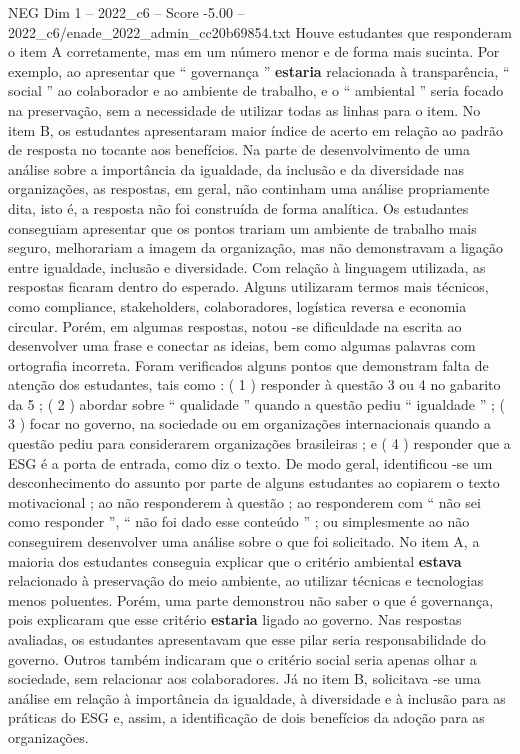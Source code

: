 \begin{textsample}{NEG Dim 1 – 2022\_c6 – Score -5.00 – 2022\_c6/enade\_2022\_admin\_cc20b69854.txt}
Houve estudantes que responderam o item A corretamente, mas em um número menor e de forma mais sucinta.
Por exemplo, ao apresentar que “ governança ” \textbf{estaria} relacionada à transparência, “ social ” ao colaborador e ao ambiente de trabalho, e o “ ambiental ” seria focado na preservação, sem a necessidade de utilizar todas as linhas para o item.
No item B, os estudantes apresentaram maior índice de acerto em relação ao padrão de resposta no tocante aos benefícios.
Na parte de desenvolvimento de uma análise sobre a importância da igualdade, da inclusão e da diversidade nas organizações, as respostas, em geral, não continham uma análise propriamente dita, isto é, a resposta não foi construída de forma analítica.
Os estudantes conseguiam apresentar que os pontos trariam um ambiente de trabalho mais seguro, melhorariam a imagem da organização, mas não demonstravam a ligação entre igualdade, inclusão e diversidade.
Com relação à linguagem utilizada, as respostas ficaram dentro do esperado.
Alguns utilizaram termos mais técnicos, como compliance, stakeholders, colaboradores, logística reversa e economia circular.
Porém, em algumas respostas, notou -se dificuldade na escrita ao desenvolver uma frase e conectar as ideias, bem como algumas palavras com ortografia incorreta.
Foram verificados alguns pontos que demonstram falta de atenção dos estudantes, tais como : ( 1 ) responder à questão 3 ou 4 no gabarito da 5 ; ( 2 ) abordar sobre “ qualidade ” quando a questão pediu “ igualdade ” ; ( 3 ) focar no governo, na sociedade ou em organizações internacionais quando a questão pediu para considerarem organizações brasileiras ; e ( 4 ) responder que a ESG é a porta de entrada, como diz o texto.
De modo geral, identificou -se um desconhecimento do assunto por parte de alguns estudantes ao copiarem o texto motivacional ; ao não responderem à questão ; ao responderem com “ não sei como responder ”, “ não foi dado esse conteúdo ” ; ou simplesmente ao não conseguirem desenvolver uma análise sobre o que foi solicitado.
No item A, a maioria dos estudantes conseguia explicar que o critério ambiental \textbf{estava} relacionado à preservação do meio ambiente, ao utilizar técnicas e tecnologias menos poluentes.
Porém, uma parte demonstrou não saber o que é governança, pois explicaram que esse critério \textbf{estaria} ligado ao governo.
Nas respostas avaliadas, os estudantes apresentavam que esse pilar seria responsabilidade do governo.
Outros também indicaram que o critério social seria apenas olhar a sociedade, sem relacionar aos colaboradores.
Já no item B, solicitava -se uma análise em relação à importância da igualdade, à diversidade e à inclusão para as práticas do ESG e, assim, a identificação de dois benefícios da adoção para as organizações.

\end{textsample}
